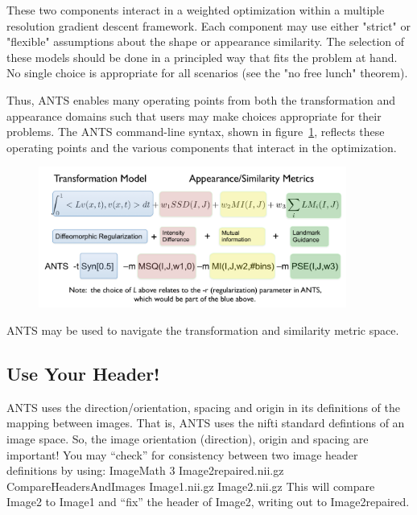 \documentclass{InsightArticle}
\begin{document}
These two components interact in a weighted optimization within a multiple resolution gradient descent framework. Each component may use either "strict" or "flexible" assumptions about the shape or appearance similarity. The selection of these models should be done in a principled way that fits the problem at hand. No single choice is appropriate for all scenarios (see the "no free lunch" theorem). 

Thus, ANTS enables many operating points from both the transformation and appearance domains such that users may make choices appropriate for their problems. The ANTS command-line syntax, shown in figure~\ref{fig:cmd}, reflects these operating points and the various components that interact in the optimization.
\begin{figure}
\includegraphics[width=0.9\textwidth]{Figures/ANTSSyntax.pdf} 
\vspace{-0.1in}
\label{fig:cmd}
\end{figure}
ANTS may be used to navigate the transformation and similarity metric space. 
\subsection{Use Your Header!} ANTS uses the direction/orientation, spacing
and origin in its definitions of the mapping between images.  That is,
ANTS uses the nifti standard defintions of an image space.  So, the
image orientation (direction), origin and spacing are important!  You
may ``check'' for consistency between two image header definitions by
using: ImageMath 3 Image2repaired.nii.gz CompareHeadersAndImages
Image1.nii.gz Image2.nii.gz \newline This will compare Image2 to
Image1 and ``fix'' the header of Image2, writing out to
Image2repaired.
\end{document}
